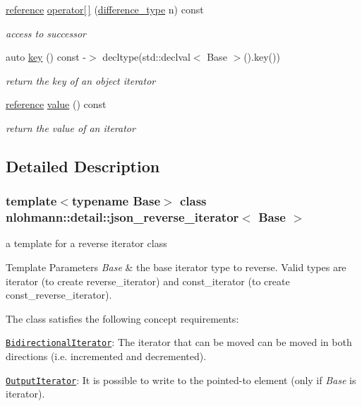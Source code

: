 \begin{DoxyCompactItemize}
\hyperlink{classnlohmann_1_1detail_1_1json__reverse__iterator_a42f51a69bac7b2aebb613b2164e457f1}{reference} \hyperlink{classnlohmann_1_1detail_1_1json__reverse__iterator_a8ed9e445e03c49c46612eb7f7d55bb61}{operator\mbox{[}$\,$\mbox{]}} (\hyperlink{classnlohmann_1_1detail_1_1json__reverse__iterator_a9ab55987c05ec6427ad36082e351cc45}{difference\+\_\+type} n) const
\begin{DoxyCompactList}\small\item\em access to successor \end{DoxyCompactList}\item 
auto \hyperlink{classnlohmann_1_1detail_1_1json__reverse__iterator_adc648a641e8e9a1072c5abd56ad06401}{key} () const -\/$>$ decltype(std\+::declval$<$ Base $>$().key())
\begin{DoxyCompactList}\small\item\em return the key of an object iterator \end{DoxyCompactList}\item 
\hyperlink{classnlohmann_1_1detail_1_1json__reverse__iterator_a42f51a69bac7b2aebb613b2164e457f1}{reference} \hyperlink{classnlohmann_1_1detail_1_1json__reverse__iterator_ae22803d442d483041d17239615f83b58}{value} () const
\begin{DoxyCompactList}\small\item\em return the value of an iterator \end{DoxyCompactList}\end{DoxyCompactItemize}


\subsection{Detailed Description}
\subsubsection*{template$<$typename Base$>$\newline
class nlohmann\+::detail\+::json\+\_\+reverse\+\_\+iterator$<$ Base $>$}

a template for a reverse iterator class 


\begin{DoxyTemplParams}{Template Parameters}
{\em Base} & the base iterator type to reverse. Valid types are iterator (to create reverse\+\_\+iterator) and const\+\_\+iterator (to create const\+\_\+reverse\+\_\+iterator).\\
\hline
\end{DoxyTemplParams}
The class satisfies the following concept requirements\+:
\begin{DoxyItemize}
\item \href{http://en.cppreference.com/w/cpp/concept/BidirectionalIterator}{\tt Bidirectional\+Iterator}\+: The iterator that can be moved can be moved in both directions (i.\+e. incremented and decremented).
\item \href{http://en.cppreference.com/w/cpp/concept/OutputIterator}{\tt Output\+Iterator}\+: It is possible to write to the pointed-\/to element (only if {\itshape Base} is iterator).
\end{DoxyItemize}

